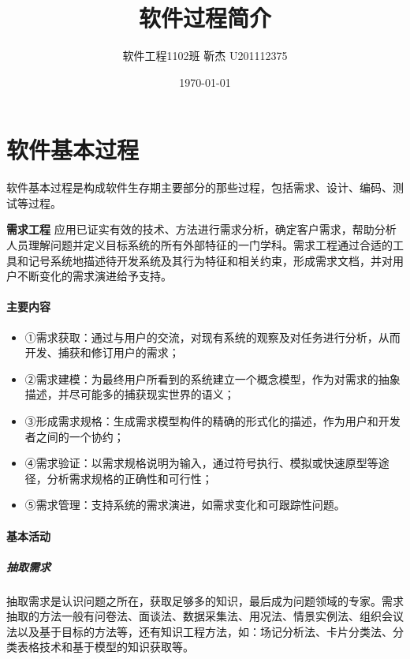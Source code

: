 \documentclass[UTF8,nofonts]{ctexart}
\title{\Huge 软件过程简介}
\author{\large	
  软件工程1102班 靳杰 U201112375}
\date{\Large\today}
\makeatletter
\renewcommand{\section}{\@startsection{section}{1}{0mm}
  {-\baselineskip}{0.5\baselineskip}{\fontsize{16pt}{16pt}\bf\leftline}}
\makeatother
\begin{document}
\maketitle
\onecolumn{
\tableofcontents}
\newpage
\part{\textbf{软件基本过程}}
软件基本过程是构成软件生存期主要部分的那些过程，包括需求、设计、编码、测试等过程。
\section{\textbf{需求工程}}
应用已证实有效的技术、方法进行需求分析，确定客户需求，帮助分析人员理解问题并定义目标系统的所有外部特征的一门学科。需求工程通过合适的工具和记号系统地描述待开发系统及其行为特征和相关约束，形成需求文档，并对用户不断变化的需求演进给予支持。
\subsection{\textbf{主要内容}}
\begin{itemize}
 \setlength{\itemsep}{0pt}
 \setlength{\parskip}{0pt}
 \setlength{\parsep}{0pt}
\item ①需求获取：通过与用户的交流，对现有系统的观察及对任务进行分析，从而开发、捕获和修订用户的需求；
\item ②需求建模：为最终用户所看到的系统建立一个概念模型，作为对需求的抽象描述，并尽可能多的捕获现实世界的语义；
\item ③形成需求规格：生成需求模型构件的精确的形式化的描述，作为用户和开发者之间的一个协约；
\item ④需求验证：以需求规格说明为输入，通过符号执行、模拟或快速原型等途径，分析需求规格的正确性和可行性；
\item ⑤需求管理：支持系统的需求演进，如需求变化和可跟踪性问题。
\end{itemize}
\subsection{\textbf{基本活动}}
\subsubsection{\textbf{抽取需求}}
抽取需求是认识问题之所在，获取足够多的知识，最后成为问题领域的专家。需求抽取的方法一般有问卷法、面谈法、数据采集法、用况法、情景实例法、组织会议法以及基于目标的方法等，还有知识工程方法，如：场记分析法、卡片分类法、分类表格技术和基于模型的知识获取等。
\end{document}
